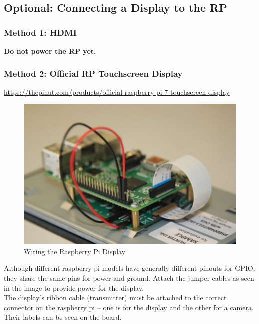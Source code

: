 \documentclass[a4paper, 10pt]{article}
\begin{document}
    \subsection{\textbf{Optional:} Connecting a Display to the RP}
            \subsubsection{\textbf{Method 1: HDMI}}

            \textbf{Do not power the RP yet.} \\
                
            \subsubsection{\textbf{Method 2: Official RP Touchscreen Display}}                   
            \url{https://thepihut.com/products/official-raspberry-pi-7-touchscreen-display}\\

            \begin{figure}[htbp]
            \centering
            \includegraphics[width=\textwidth]{media/rp_display_wiring.jpg}
            \caption{Wiring the Raspberry Pi Display}
            \label{fig:rp_display_wiring}
            \end{figure}

            \noindent Although different raspberry pi models have generally different pinouts for GPIO, they share the same pins for power and ground. 
            Attach the jumper cables as seen in the image to provide power for the display. \\

            \noindent The display’s ribbon cable (transmitter) must be attached to the correct connector on the raspberry pi – one is for the display and the other for a camera. Their labels can be seen on the board. \\
\end{document}
